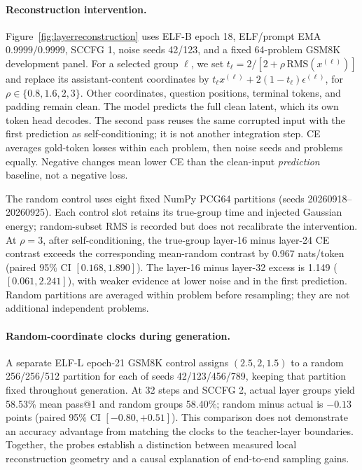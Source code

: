 \paragraph{Reconstruction intervention.}
Figure~\ref{fig:layerreconstruction} uses ELF-B epoch 18, ELF/prompt EMA $0.9999/0.9999$, SCCFG 1, noise seeds 42/123, and a fixed 64-problem GSM8K development panel. For a selected group $\ell$, we set $t_\ell=2/[2+\rho\,\mathrm{RMS}(x^{(\ell)})]$ and replace its assistant-content coordinates by $t_\ell x^{(\ell)}+2(1-t_\ell)\epsilon^{(\ell)}$, for $\rho\in\{0.8,1.6,2,3\}$. Other coordinates, question positions, terminal tokens, and padding remain clean. The model predicts the full clean latent, which its own token head decodes. The second pass reuses the same corrupted input with the first prediction as self-conditioning; it is not another integration step. CE averages gold-token losses within each problem, then noise seeds and problems equally. Negative changes mean lower CE than the clean-input \emph{prediction} baseline, not a negative loss.

The random control uses eight fixed NumPy PCG64 partitions (seeds 20260918--20260925). Each control slot retains its true-group time and injected Gaussian energy; random-subset RMS is recorded but does not recalibrate the intervention. At $\rho=3$, after self-conditioning, the true-group layer-16 minus layer-24 CE contrast exceeds the corresponding mean-random contrast by 0.967 nats/token (paired 95\% CI $[0.168,1.890]$). The layer-16 minus layer-32 excess is 1.149 ($[0.061,2.241]$), with weaker evidence at lower noise and in the first prediction. Random partitions are averaged within problem before resampling; they are not additional independent problems.

\paragraph{Random-coordinate clocks during generation.}
A separate ELF-L epoch-21 GSM8K control assigns $(2.5,2,1.5)$ to a random 256/256/512 partition for each of seeds 42/123/456/789, keeping that partition fixed throughout generation. At 32 steps and SCCFG 2, actual layer groups yield 58.53\% mean pass@1 and random groups 58.40\%; random minus actual is $-0.13$ points (paired 95\% CI $[-0.80,+0.51]$). This comparison does not demonstrate an accuracy advantage from matching the clocks to the teacher-layer boundaries. Together, the probes establish a distinction between measured local reconstruction geometry and a causal explanation of end-to-end sampling gains.
